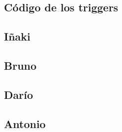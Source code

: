 \documentclass[a4paper, 11pt]{article}
\begin{document}
\newpage
\subsection{Código de los triggers}
\subsection{Iñaki}

\subsection{Bruno}

\subsection{Darío}

\subsection{Antonio}

\end{document}
